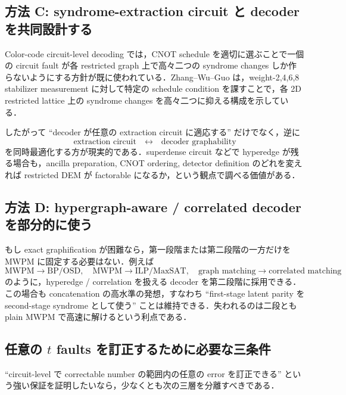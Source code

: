 \documentclass[a4paper,11pt]{ltjsarticle}
\begin{document}
\subsection{方法 C: syndrome-extraction circuit と decoder を共同設計する}

Color-code circuit-level decoding では，CNOT schedule を適切に選ぶことで一個の circuit fault が各 restricted graph 上で高々二つの syndrome changes しか作らないようにする方針が既に使われている．Zhang--Wu--Guo は，weight-2,4,6,8 stabilizer measurement に対して特定の schedule condition を課すことで，各 2D restricted lattice 上の syndrome changes を高々二つに抑える構成を示している．

したがって ``decoder が任意の extraction circuit に適応する'' だけでなく，逆に
\begin{equation}
 \text{extraction circuit}\quad\longleftrightarrow\quad\text{decoder graphability}
\end{equation}
を同時最適化する方が現実的である．superdense circuit などで hyperedge が残る場合も，ancilla preparation, CNOT ordering, detector definition のどれを変えれば restricted DEM が factorable になるか，という観点で調べる価値がある．

\subsection{方法 D: hypergraph-aware / correlated decoder を部分的に使う}

もし exact graphification が困難なら，第一段階または第二段階の一方だけを MWPM に固定する必要はない．例えば
\begin{equation}
 \text{MWPM}\to\text{BP/OSD},\quad
 \text{MWPM}\to\text{ILP/MaxSAT},\quad
 \text{graph matching}\to\text{correlated matching}
\end{equation}
のように，hyperedge / correlation を扱える decoder を第二段階に採用できる．この場合も concatenation の高水準の発想，すなわち ``first-stage latent parity を second-stage syndrome として使う'' ことは維持できる．失われるのは二段とも plain MWPM で高速に解けるという利点である．

\subsection{任意の $t$ faults を訂正するために必要な三条件}

``circuit-level で correctable number の範囲内の任意の error を訂正できる'' という強い保証を証明したいなら，少なくとも次の三層を分離すべきである．
\end{document}
